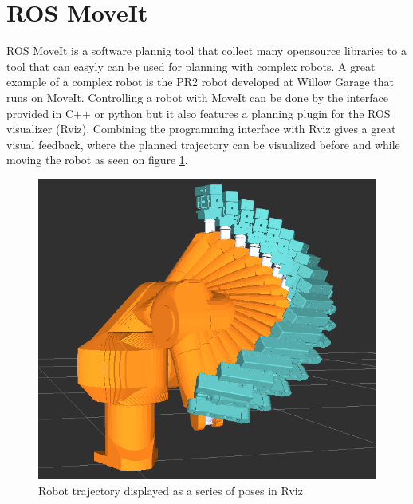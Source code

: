 \section{ROS MoveIt}
\label{sec:moveit}
ROS MoveIt is a software plannig tool that collect many opensource libraries to a tool that can easyly can be used for planning with complex robots. A great example of a complex robot is the PR2 robot developed at Willow Garage that runs on MoveIt.
Controlling a robot with MoveIt can be done by the interface provided in C++ or python but it also features a planning plugin for the ROS visualizer (Rviz). Combining the programming interface with Rviz gives a great visual feedback, where the planned trajectory can be visualized before and while moving the robot as seen on figure \ref{fig:robot_trajectory}.

\begin{figure}[htb]
	\begin{center}
		\includegraphics[scale=0.5,trim=0 0 0 0]{graphics/05_robotics/robot_trajectory.png}%
		\caption{Robot trajectory displayed as a series of poses in Rviz}
		\label{fig:robot_trajectory}
	\end{center}
\end{figure}


